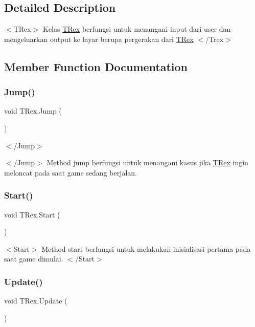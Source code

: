 \subsection{Detailed Description}
$<$\+T\+Rex$>$ Kelas \hyperlink{class_t_rex}{T\+Rex} berfungsi untuk menangani input dari user dan mengeluarkan output ke layar berupa pergerakan dari \hyperlink{class_t_rex}{T\+Rex} $<$/\+Trex$>$ 

\subsection{Member Function Documentation}
\hypertarget{class_t_rex_a55c1bb4f0e4365269b1022cc9aa4ca8f}{}\label{class_t_rex_a55c1bb4f0e4365269b1022cc9aa4ca8f} 
\subsubsection{\texorpdfstring{Jump()}{Jump()}}
{\footnotesize\ttfamily void T\+Rex.\+Jump (\begin{DoxyParamCaption}{ }\end{DoxyParamCaption})\hspace{0.3cm}{\ttfamily [private]}}



$<$/\+Jump$>$ 

$<$/\+Jump$>$ Method jump berfungsi untuk menangani kasus jika \hyperlink{class_t_rex}{T\+Rex} ingin meloncat pada saat game sedang berjalan. \hypertarget{class_t_rex_ab9ca989e4ae071cad6a6766be74ff428}{}\label{class_t_rex_ab9ca989e4ae071cad6a6766be74ff428} 
\subsubsection{\texorpdfstring{Start()}{Start()}}
{\footnotesize\ttfamily void T\+Rex.\+Start (\begin{DoxyParamCaption}{ }\end{DoxyParamCaption})\hspace{0.3cm}{\ttfamily [private]}}

$<$\+Start$>$ Method start berfungsi untuk melakukan inisialisasi pertama pada saat game dimulai. $<$/\+Start$>$ \hypertarget{class_t_rex_ab15426b15c8f9300d335aaeee5a7a7fc}{}\label{class_t_rex_ab15426b15c8f9300d335aaeee5a7a7fc} 
\subsubsection{\texorpdfstring{Update()}{Update()}}
{\footnotesize\ttfamily void T\+Rex.\+Update (\begin{DoxyParamCaption}{ }\end{DoxyParamCaption})\hspace{0.3cm}{\ttfamily [private]}}

